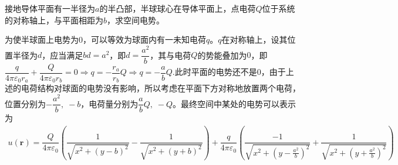 \documentclass{mynote}
\begin{document}
\begin{exercise}{2.11}
    接地导体平面有一半径为$a$的半凸部，半球球心在导体平面上，点电荷$Q$位于系统的对称轴上，与平面相距为$b$，求空间电势。
\end{exercise}
\begin{solution}
    为使半球面上电势为$0$，可以等效为球面内有一未知电荷$q$。$q$在对称轴上，设其位置半径为$d$，应当满足$bd=a^2$，即$d = \dfrac{a^2}{b}$，其与电荷$Q$的势能叠加为$0$，即$\dfrac{q}{4\pi \varepsilon_0 r_a} + \dfrac{Q}{4\pi \varepsilon_0 r_b} = 0 \Rightarrow q = -\dfrac{r_a}{r_b} Q \Rightarrow q = -\dfrac{a}{b}Q$.此时平面的电势还不是$0$，由于上述的电荷结构对球面的电势没有影响，所以考虑在平面下方对称地放置两个电荷，位置分别为$-\dfrac{a^2}{b},\; -b$，电荷量分别为$\dfrac{a}{b}Q,\; -Q$。最终空间中某处的电势可以表示为
    \begin{align*}
        u(\bm{r}) = \dfrac{Q}{4\pi \varepsilon_0} \left( \dfrac{1}{\sqrt{x^2 + (y-b)^2}} - \dfrac{1}{\sqrt{x^2 + (y+b)^2}} \right) + \dfrac{q}{4\pi \varepsilon_0} \left( \dfrac{-1}{\sqrt{x^2 + (y-\frac{a^2}{b})^2}} + \dfrac{1}{\sqrt{x^2 + (y+\frac{a^2}{b})^2}} \right)
    \end{align*}
\end{solution}
\end{document}
